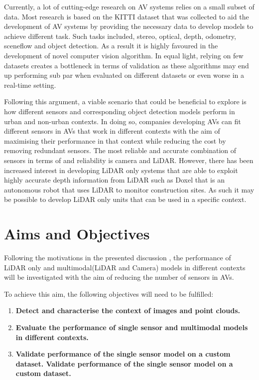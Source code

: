 Currently, a lot of cutting-edge research on AV systems relies on a small subset of data. Most research is based on the  KITTI \cite{Geiger2012CVPR} dataset that was collected to aid the development of AV systems by providing the necessary data to develop models to achieve different task. Such tasks included, stereo, optical, depth, odometry, sceneflow and object detection. As a result it is highly favoured in the development of novel computer vision algorithm. 
In equal light, relying on few datasets creates a bottleneck in terms of validation as these algorithms may end up performing sub par when evaluated on different datasets or even worse in a real-time setting. 

Following this argument, a viable scenario that could be beneficial to explore is how different sensors and corresponding object detection models perform in urban and non-urban contexts. In doing so, companies developing AVs can fit different sensors in AVs that work in different contexts with the aim of maximising their performance in that context while reducing the cost by removing redundant sensors. The most reliable and accurate combination of sensors in terms of and reliability is camera and LiDAR. However, there has been increased interest in developing LiDAR only systems that are able to exploit highly accurate depth information from LiDAR such as Doxel\cite{doxel} that is an autonomous robot that uses LiDAR to monitor construction sites. As such it may be possible to develop LiDAR only units that can be used in a specific context. 

\section{Aims and Objectives}
Following the motivations in the presented discussion , the performance of LiDAR only and multimodal(LiDAR and Camera) models in different contexts will be investigated with the aim of reducing the number of sensors in AVs.

To achieve this aim, the following objectives will need to be fulfilled:
\begin{enumerate}
	\item \textbf{Detect and characterise the context of images and point clouds.}
	\item \textbf{Evaluate the performance of single sensor and multimodal models in different contexts. }
	\item \textbf{Validate performance of the single sensor model on a custom dataset. Validate performance of the single sensor model on a custom dataset.}
\end{enumerate}

